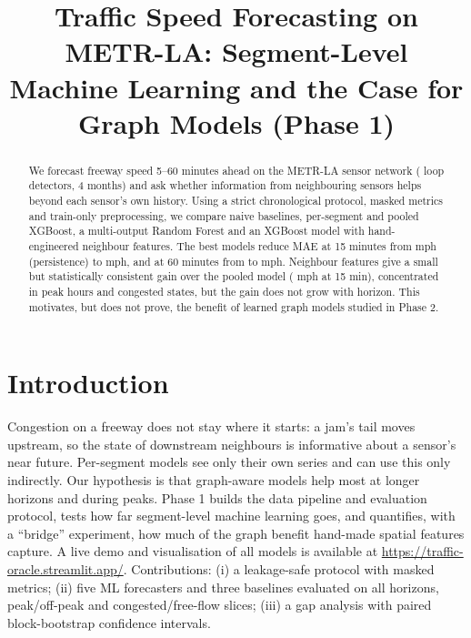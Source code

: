 \documentclass[conference]{IEEEtran}
\begin{document}
\title{Traffic Speed Forecasting on METR-LA: Segment-Level Machine Learning and the Case for Graph Models (Phase 1)}
\author{}
\maketitle

\begin{abstract}
We forecast freeway speed 5--60 minutes ahead on the METR-LA sensor network (\graphNodes{} loop detectors, 4 months) and ask whether information from neighbouring sensors helps beyond each sensor's own history.
Using a strict chronological protocol, masked metrics and train-only preprocessing, we compare naive baselines, per-segment and pooled XGBoost, a multi-output Random Forest and an XGBoost model with hand-engineered neighbour features.
The best models reduce MAE at 15 minutes from \maePersistenceFifteen{} mph (persistence) to \maeXgbSpatialFifteen{} mph, and at 60 minutes from \maePersistenceSixty{} to \maeXgbPerSegmentSixty{} mph.
Neighbour features give a small but statistically consistent gain over the pooled model (\gapAllFifteen{} mph at 15 min), concentrated in peak hours and congested states, but the gain does not grow with horizon.
This motivates, but does not prove, the benefit of learned graph models studied in Phase 2.
\end{abstract}

\section{Introduction}
Congestion on a freeway does not stay where it starts: a jam's tail moves upstream, so the state of downstream neighbours is informative about a sensor's near future.
Per-segment models see only their own series and can use this only indirectly.
Our hypothesis is that graph-aware models help most at longer horizons and during peaks.
Phase 1 builds the data pipeline and evaluation protocol, tests how far segment-level machine learning goes, and quantifies, with a ``bridge'' experiment, how much of the graph benefit hand-made spatial features capture.
A live demo and visualisation of all models is available at \url{https://traffic-oracle.streamlit.app/}.
Contributions: (i) a leakage-safe protocol with masked metrics; (ii) five ML forecasters and three baselines evaluated on all horizons, peak/off-peak and congested/free-flow slices; (iii) a gap analysis with paired block-bootstrap confidence intervals.
\end{document}
